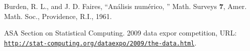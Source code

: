 \documentclass{endm}
\begin{document}
\begin{thebibliography}{10}\label{bibliography}
  
 Burden, R. L., and J. D. Faires, ``An\'alisis num\'erico,
'' Math. Surveys \textbf{7}, Amer. Math. Soc.,
  Providence, R.I., 1961.
  
 ASA Section on Statistical Computing. 2009 data expor competition, URL:
  \href{http://stat-computing.org/dataexpo/2009/the-data.html}
  {\texttt{http://stat-computing.org/dataexpo/2009/the-data.html}}.

\end{thebibliography}
\end{document}
